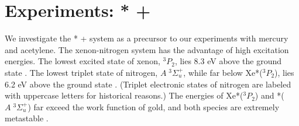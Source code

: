 


\section{Experiments: * + }

We investigate the * +  system as a precursor to our
experiments with mercury and acetylene.  The xenon-nitrogen system has
the advantage of high excitation energies.  The lowest excited state
of xenon, $^3P_2$, lies 8.3 eV above the ground state
\cite{saloman04}.  The lowest triplet state of nitrogen, $A \;
^3\Sigma_u^+$, while far below Xe*($^3P_2$), lies 6.2 eV above the
ground state \cite{lofthus77}.  (Triplet electronic states of nitrogen
are labeled with uppercase letters for historical reasons.)  The
energies of Xe*($^3P_2$) and *($A \; ^3\Sigma_u^+$) far exceed
the work function of gold, and both species are extremely metastable
\cite{mishra01, lofthus77}.

